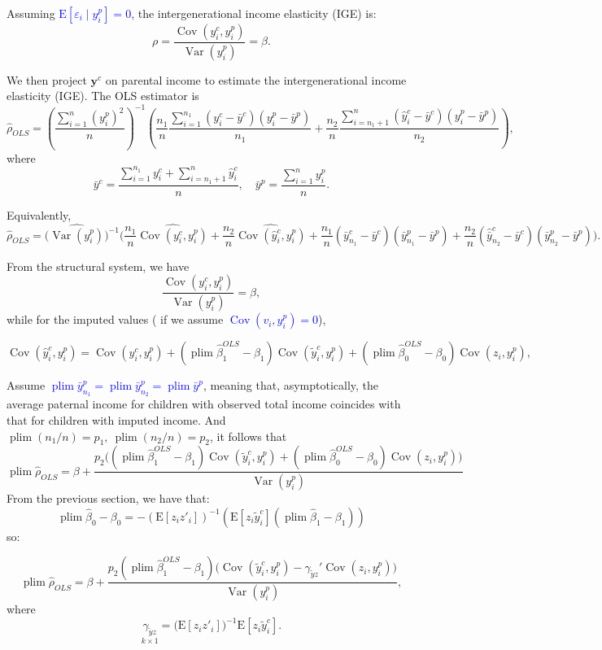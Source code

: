 \documentclass[12pt,oneside]{article}
\DeclareMathOperator*{\plim}{plim}
\theoremstyle{bracket}
\begin{document}
Assuming \textcolor{blue}{$\mathrm{E}[\varepsilon_i \mid y_i^p]=0$}, the intergenerational income elasticity (IGE) is:
\[
\rho = \frac{\operatorname{Cov}(y_i^c,y_i^p)}{\operatorname{Var}(y_i^p)} = \beta.
\]

We then project $\mathbf{y}^c$ on parental income to estimate the intergenerational income elasticity (IGE).
The OLS estimator is
\[
\hat{\rho}_{OLS} = \left(\frac{\sum_{i=1}^n (y_i^p)^2}{n}\right)^{-1}
\left(\frac{n_1}{n}\frac{\sum_{i=1}^{n_1}(y_i^c-\bar{y}^c)(y_i^p-\bar{y}^p)}{n_1}+
\frac{n_2}{n}\frac{\sum_{i=n_1+1}^{n}(\hat{y}_i^c-\bar{y}^c)(y_i^p-\bar{y}^p)}{n_2}\right),
\]
where
\[
\bar{y}^c = \frac{\sum_{i=1}^{n_1} y^c_i + \sum_{i=n_1+1}^n \hat{y}^c_i}{n}, 
\quad 
\bar{y}^p = \frac{\sum_{i=1}^n y_i^p}{n}.
\]

Equivalently,
\[
\hat{\rho}_{OLS} = \big(\widehat{\operatorname{Var}(y_i^p)}\big)^{-1}\Bigg(
\frac{n_1}{n}\widehat{\operatorname{Cov}(y_i^c,y_i^p)} +
\frac{n_2}{n}\widehat{\operatorname{Cov}(\hat{y}_i^c,y_i^p)} +
\frac{n_1}{n}(\bar{y}^c_{n_1}-\bar{y}^c)(\bar{y}^p_{n_1}-\bar{y}^p) +
\frac{n_2}{n}(\hat{\bar{y}}^c_{n_2}-\bar{y}^c)(\bar{y}^p_{n_2}-\bar{y}^p)\Bigg).
\]

From the structural system, we have
\[
\frac{\operatorname{Cov}(y_i^c,y_i^p)}{\operatorname{Var}(y_i^p)} = \beta,
\]
while for the imputed values ( if we assume \textcolor{blue}{$\operatorname{Cov}(v_i,y_i^p)=0$}),

\[
\operatorname{Cov}(\hat{y}_i^c,y_i^p)=\operatorname{Cov}(y_i^c,y_i^p)+(\plim \hat{\beta}_1^{OLS} - \beta_1)\operatorname{Cov}(\tilde{y}_i^c,y_i^p)+(\plim \hat{\beta}_0^{OLS} - \beta_0)\operatorname{Cov}(z_i,y_i^p),
\]

Assume \textcolor{blue}{$\plim \bar{y}^p_{n_1} = \plim \bar{y}^p_{n_2} = \plim \bar{y}^p$}, meaning that, asymptotically, the average paternal income for children with observed total income coincides with that for children with imputed income.
And $\plim (n_1/n) = p_1,\ \plim (n_2/n) = p_2$, it follows that
\[
\plim \hat{\rho}_{OLS} = \beta + \frac{p_2\big((\plim \hat{\beta}_1^{OLS} - \beta_1)\operatorname{Cov}(\tilde{y}_i^c,y_i^p) + (\plim \hat{\beta}_0^{OLS} - \beta_0)\operatorname{Cov}(z_i,y_i^p)\big)}{\operatorname{Var}(y_i^p)}
\]
From the previous section, we have that:
$$\plim \hat\beta_0-\beta_0 = -(\mathrm{E}[z_iz'_i])^{-1}(\mathrm{E}[z_i\tilde{y}_i^c](\plim \hat\beta_1-\beta_1))$$
 so:

\[
\plim \hat{\rho}_{OLS} = \beta +\frac{p_2(\plim \hat{\beta}_1^{OLS} - \beta_1)\big(\operatorname{Cov}(\tilde{y}_i^c,y_i^p)-\gamma_{\tilde{y}z}'\operatorname{Cov}(z_i,y_i^p)\big)}{\operatorname{Var}(y_i^p)},
\]
 where 
 \[
\underset{k\times1}{\gamma_{\tilde{y}z}} = \big(\mathrm{E}[z_i z'_i]\big)^{-1}\mathrm{E}[z_i \tilde{y}_i^c].
\]
\end{document}
